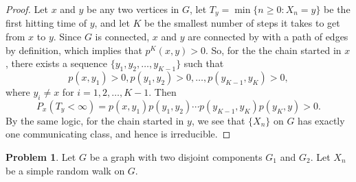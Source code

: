 \documentclass[oneside,reqno]{amsart}
\theoremstyle{definition}
\newtheorem{prob}{Problem}
\begin{document}
\begin{proof}
Let $x$ and $y$ be any two vertices in $G$, let $T_y = \min\{n \geq 0 : X_n  =y\}$ be the first hitting time of $y$, and let $K$ be the smallest number of steps it takes to get from $x$ to $y$. Since $G$ is connected, $x$ and $y$ are connected by with a path of edges by definition, which implies that $p^K(x,y)>0$. So, for the the chain started in $x$, there exists a sequence $\{y_1, y_2, \dotsc, y_{K-1}\}$ such that 
\[
	p(x, y_1)>0, p(y_1,y_2)>0,\dotsc, p(y_{K-1},y_K)>0,
\] 
where $y_i \neq x$ for $i=1,2,\dotsc, K-1$. Then 
\[
	P_x(T_y < \infty) = p(x, y_1)p(y_1,y_2) \cdots p(y_{K-1},y_K)p(y_K,y) > 0.
\]
By the same logic, for the chain started in $y$, we see that $\{X_n\}$ on $G$ has exactly one communicating class, and hence is irreducible. 
\end{proof}

\begin{prob}
Let $G$ be a graph with two disjoint components $G_1$ and $G_2$. Let $X_n$ be a simple random walk on $G$.
\end{prob}
\end{document}
